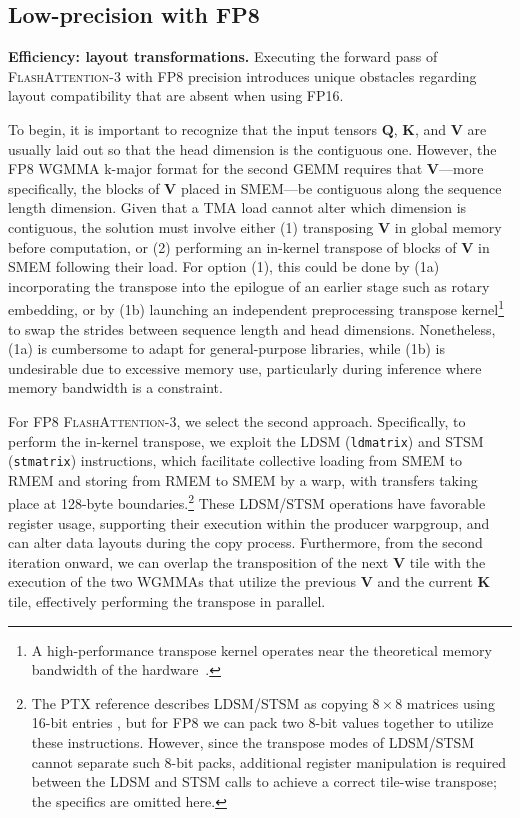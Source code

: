 \subsection{Low-precision with FP8}
\label{sec:algofp8}

\textbf{Efficiency: layout transformations.} Executing the forward pass of \textsc{FlashAttention-3} with FP8 precision introduces unique obstacles regarding layout compatibility that are absent when using FP16.

To begin, it is important to recognize that the input tensors $\mathbf{Q}$, $\mathbf{K}$, and $\mathbf{V}$ are usually laid out so that the head dimension is the contiguous one. However, the FP8 WGMMA k-major format for the second GEMM requires that $\mathbf{V}$—more specifically, the blocks of $\mathbf{V}$ placed in SMEM—be contiguous along the sequence length dimension. Given that a TMA load cannot alter which dimension is contiguous, the solution must involve either (1) transposing $\mathbf{V}$ in global memory before computation, or (2) performing an in-kernel transpose of blocks of $\mathbf{V}$ in SMEM following their load. For option (1), this could be done by (1a) incorporating the transpose into the epilogue of an earlier stage such as rotary embedding, or by (1b) launching an independent preprocessing transpose kernel\footnote{A high-performance transpose kernel operates near the theoretical memory bandwidth of the hardware~\citep{colfax_cutlass_transpose_2024}.} to swap the strides between sequence length and head dimensions. Nonetheless, (1a) is cumbersome to adapt for general-purpose libraries, while (1b) is undesirable due to excessive memory use, particularly during inference where memory bandwidth is a constraint.

For FP8 \textsc{FlashAttention-3}, we select the second approach. Specifically, to perform the in-kernel transpose, we exploit the LDSM (\verb|ldmatrix|) and STSM (\verb|stmatrix|) instructions, which facilitate collective loading from SMEM to RMEM and storing from RMEM to SMEM by a warp, with transfers taking place at 128-byte boundaries.\footnote{The PTX reference describes LDSM/STSM as copying $8 \times 8$ matrices using 16-bit entries \cite[\S 9.7.13.4.15-16]{ptx}, but for FP8 we can pack two 8-bit values together to utilize these instructions. However, since the transpose modes of LDSM/STSM cannot separate such 8-bit packs, additional register manipulation is required between the LDSM and STSM calls to achieve a correct tile-wise transpose; the specifics are omitted here.} These LDSM/STSM operations have favorable register usage, supporting their execution within the producer warpgroup, and can alter data layouts during the copy process. Furthermore, from the second iteration onward, we can overlap the transposition of the next $\mathbf{V}$ tile with the execution of the two WGMMAs that utilize the previous $\mathbf{V}$ and the current $\mathbf{K}$ tile, effectively performing the transpose in parallel.

